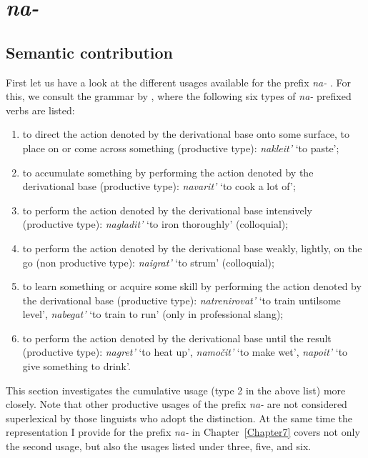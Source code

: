 \section{\textit{na-}  }\label{subsection:semantics:na}
\subsection{Semantic contribution}
First let us have a look at the different usages available for the prefix \textit{na-}  . For this, we consult the grammar by \citet[360]{Shvedova:82}, where the following six types of \textit{na-}  prefixed verbs are listed:
\begin{enumerate}
\item to direct the action denoted by the derivational base onto some surface, to place on or come across something (productive type): \textit{nakleit'} `to paste';
\item to accumulate something by performing the action denoted by the derivational base (productive type): \textit{navarit'} `to cook a lot of';
\item to perform the action denoted by the derivational base intensively (productive type): \textit{nagladit'} `to iron thoroughly' (colloquial);
\item to perform the action denoted by the derivational base weakly, lightly, on the go (non productive type): \textit{naigrat'} `to strum' (colloquial);
\item to learn something or acquire some skill by performing the action denoted by the derivational base (productive type): \textit{natrenirovat'} `to train until\linebreak some level', \textit{nabegat'} `to train to run' (only in professional slang);
\item to perform the action denoted by the derivational base until the result (productive type): \textit{nagret'} `to heat up', \textit{namo\v{c}it'} `to make wet', \textit{napoit'} `to give something to drink'.
\end{enumerate}

This section investigates the cumulative  usage (type 2 in the above list) more closely. Note that other productive usages of the prefix \textit{na-}   are not considered superlexical by those linguists who adopt the distinction. At the same time the representation I provide for the prefix \textit{na-}   in Chapter~\ref{Chapter7} covers not only the second usage, but also the usages listed under three, five, and six.

